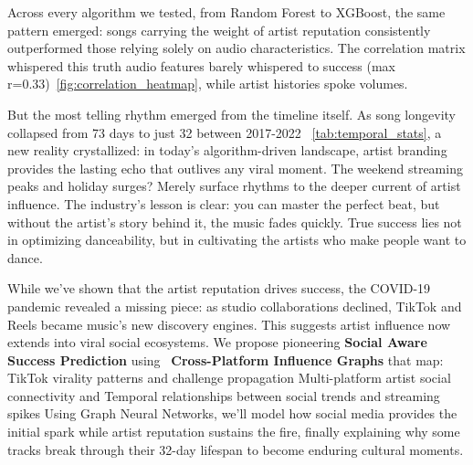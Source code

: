 \documentclass{article}
\begin{document}
Across every algorithm we tested, from Random Forest to XGBoost, the same pattern emerged: songs carrying the weight of artist reputation consistently outperformed those relying solely on audio characteristics. The correlation matrix whispered this truth audio features barely whispered to success (max r=0.33)~\ref{fig:correlation_heatmap}, while artist histories spoke volumes.

But the most telling rhythm emerged from the timeline itself. As song longevity collapsed from 73 days to just 32 between 2017-2022 ~\ref{tab:temporal_stats}, a new reality crystallized: in today's algorithm-driven landscape, artist branding provides the lasting echo that outlives any viral moment. The weekend streaming peaks and holiday surges? Merely surface rhythms to the deeper current of artist influence. The industry's lesson is clear: you can master the perfect beat, but without the artist's story behind it, the music fades quickly. True success lies not in optimizing danceability, but in cultivating the artists who make people want to dance.

While we've shown that the artist reputation drives success, the COVID-19 pandemic revealed a missing piece: as studio collaborations declined, TikTok and Reels became music's new discovery engines. This suggests artist influence now extends into viral social ecosystems. We propose pioneering \textbf{Social Aware Success Prediction} using ~\textbf{Cross-Platform Influence Graphs} that map: TikTok virality patterns and challenge propagation
Multi-platform artist social connectivity and Temporal relationships between social trends and streaming spikes Using Graph Neural Networks, we'll model how social media provides the initial spark while artist reputation sustains the fire, finally explaining why some tracks break through their 32-day lifespan to become enduring cultural moments.



\end{document}
